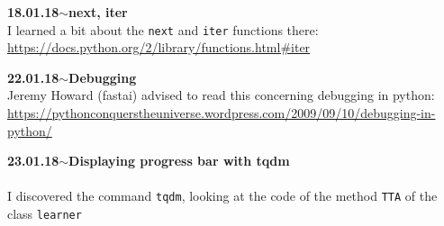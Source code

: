 \documentclass[11pt,a4paper]{article}
\newenvironment{loggentry}[2]%
{\noindent\textbf{#1}\hspace{1cm}$\mathbf{\sim}$\text{ }\textbf{#2}\\}{\vspace{0.5cm}}
\begin{document}
\begin{loggentry}{18.01.18}{next, iter}
I learned a bit about the \texttt{next} and \texttt{iter} functions there:\\
\url{https://docs.python.org/2/library/functions.html#iter}\\
\end{loggentry}

\begin{loggentry}{22.01.18}{Debugging}
Jeremy Howard (fastai) advised to read this concerning debugging in python:\\
\url{https://pythonconquerstheuniverse.wordpress.com/2009/09/10/debugging-in-python/}
\end{loggentry}

\begin{loggentry}{23.01.18}{Displaying progress bar with tqdm}\\
I discovered the command \texttt{tqdm}, looking at the code of the method \texttt{TTA} of the class \texttt{learner}
\end{loggentry}
\end{document}
